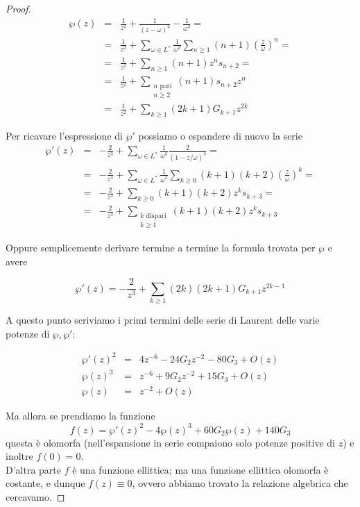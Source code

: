 \begin{proof}
    \begin{eqnarray*}
    \wp(z) & = & \frac{1}{z^2} + \frac1{(z-\omega)^2}-\frac1{\omega^2} = \\
           & = & \frac{1}{z^2} + \sum_{\omega \in L^*} \frac{1}{\omega^2} \sum_{n \ge 1} (n+1) \left ( \frac{z}{\omega} \right ) ^n =  \\
           & = & \frac{1}{z^2} + \sum_{n \ge 1} (n+1) z^n s_{n+2} = \\
           & = & \frac{1}{z^2} + \sum_{\substack{n \text{ pari} \\ n \ge 2}} (n+1)s_{n+2} z^n \\
           & = & \frac{1}{z^2} + \sum_{k\ge1} (2k+1)G_{k+1} z^{2k}
    \end{eqnarray*}

    Per ricavare l'espressione di $\wp'$ possiamo o espandere di nuovo la serie
    \begin{eqnarray*}
    \wp'(z)& = & -\frac{2}{z^3}+ \sum_{\omega \in L^*} \frac{1}{\omega^3} \frac{2}{(1-z/\omega)^3}= \\
           & = & -\frac{2}{z^3}+ \sum_{\omega \in L^*} \frac{1}{\omega^3} \sum_{k \ge 0} (k+1)(k+2) \left ( \frac{z}{\omega} \right ) ^k =\\
           & = & -\frac{2}{z^3} + \sum_{k \ge 0} (k+1)(k+2) z^k s_{k+3} =\\
           & = & -\frac{2}{z^3} + \sum_{\substack{k \text{ dispari} \\ k \ge 1}} (k+1)(k+2) z^k s_{k+3}
    \end{eqnarray*}

    Oppure semplicemente derivare termine a termine la formula trovata per $\wp$ e avere

    $$ \wp'(z) = -\frac{2}{z^3}+\sum_{k\ge1}(2k)(2k+1)G_{k+1}z^{2k-1}$$


    A questo punto scriviamo i primi termini delle serie di Laurent delle varie potenze di $\wp,\wp'$:

    \begin{eqnarray*}
    \wp'(z)^2& = & 4z^{-6}-24G_2z^{-2}-80G_3+O(z) \\
    \wp(z)^3 & = & z^{-6}+9G_2z^{-2}+15G_3+O(z)  \\
    \wp(z) & = & z^{-2}+O(z)
    \end{eqnarray*}

    Ma allora se prendiamo la funzione $$ f(z)= \wp'(z)^2 -4\wp(z)^3+60G_2\wp(z)+140G_3 $$
    questa è olomorfa (nell'espansione in serie compaiono solo potenze positive di $z$) e inoltre $f(0)=0$.\\
    D'altra parte $f$ è una funzione ellittica; ma una funzione ellittica olomorfa è costante, e dunque $f(z)\equiv 0$, ovvero abbiamo trovato la relazione algebrica che cercavamo.

\end{proof}
